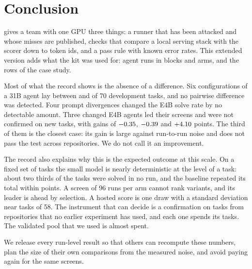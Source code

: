 \section{Conclusion}\label{sec:conclusion}

\kit{} gives a team with one GPU three things: a runner that has been attacked and whose misses are published, checks
that compare a local serving stack with the scorer down to token ids, and a pass rule with known error rates. This
extended version adds what the kit was used for: \RunsTotal{} agent runs in \BlocksTotal{} blocks and \ArmsTotal{}
arms, and the \CaseRows{} rows of the case study.

Most of what the record shows is the absence of a difference. Six configurations of a 31B agent lay between
\PubMinSeventy{} and \PubMaxSeventy{} of 70 development tasks, and no pairwise difference was detected. Four
prompt divergences changed the E4B solve rate by no detectable amount. Three changed E4B agents led their screens and
were not confirmed on new tasks, with gains of $-0.35$, $-0.39$ and $+4.10$ points. The third of them is
the closest case: its gain is large against run-to-run noise and does not pass the test across repositories. We do
not call it an improvement.

The record also explains why this is the expected outcome at this scale. On a fixed set of tasks the small model is
nearly deterministic at the level of a task: about two thirds of the tasks were solved in no run, and the baseline
repeated its total within \RepeatHDiff{} points. A screen of 96 runs per arm cannot rank variants, and its leader is
ahead by selection. A hosted score is one draw with a standard deviation near \HostedSdTasks{} tasks of 58. The
instrument that can decide is a confirmation on tasks from repositories that no earlier experiment has used, and
each one spends its tasks. The validated pool that we used is almost spent.

We release every run-level result so that others can recompute these numbers, plan the size of their own
comparisons from the measured noise, and avoid paying again for the same screens.
